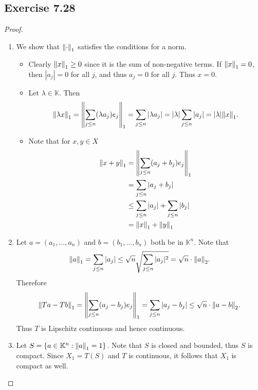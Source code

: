 \documentclass[hw_all.tex]{subfiles}
\begin{document}
\subsection{Exercise 7.28}
\begin{proof}
    \begin{enumerate}
        \item
            We show that $\norm{\cdot}_1$ satisfies the conditions for a norm.
            \begin{itemize}
                \item 
                    Clearly $\norm{x}_1 \geq 0$ since it is the sum of non-negative terms. If $\norm{x}_1 = 0$, then $|a_j| = 0$ for all $j$, and thus $a_j = 0$ for all $j$. Thus $x = 0$.

                \item 
                    Let $\lambda \in \mathbb{K}$. Then
                    \[
                        \norm{\lambda x}_1 = \norm{\sum_{j \leq n} (\lambda a_j) e_j}_1 = \sum_{j \leq n} |\lambda a_j| = |\lambda| \sum_{j \leq n} |a_j| = |\lambda| \norm{x}_1
                    .\]

                \item 
                    Note that for $x,y \in X$
                    \begin{align*}
                        \norm{x + y}_1 &= \norm{\sum_{j \leq n} (a_j + b_j)e_j}_1 \\
                        &= \sum_{j \leq n} |a_j + b_j| \\
                        &\leq \sum_{j \leq n} |a_j| + \sum_{j \leq n} |b_j| \\
                        &= \norm{x}_1 + \norm{y}_1
                    \end{align*}
            \end{itemize}

        \item 
            Let $a = (a_1, \ldots, a_n)$ and $b = (b_1, \ldots, b_n)$ both be in $\mathbb{K}^n$. Note that
            \[
                \norm{a}_1 = \sum_{j \leq n} |a_j| \leq \sqrt{n} \sqrt{\sum_{j \leq n} |a_j|^2} = \sqrt{n} \cdot \norm{a}_2
            .\]
            Therefore
            \[
                \norm{Ta - Tb}_1 = \norm{\sum_{j \leq n}(a_j - b_j)e_j}_1 = \sum_{j \leq n} |a_j - b_j| \leq \sqrt{n} \cdot \norm{a - b}_2
            .\]
            Thus $T$ is Lipschitz continuous and hence continuous.
            
        \item 
            Let $S = \qty{a \in \mathbb{K}^n : \norm{a}_1 = 1}$. Note that $S$ is closed and bounded, thus $S$ is compact. Since $X_1 = T(S)$ and $T$ is continuous, it follows that $X_1$ is compact as well.


\end{enumerate}
\end{proof}
\end{document}
